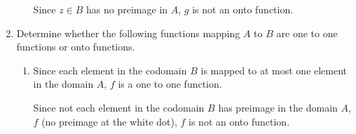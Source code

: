 \documentclass[12pt]{report}
\begin{document}
\begin{enumerate}
\begin{enumerate}
                Since $z \in B$ has no preimage in $A$, $g$ is not an onto function.
        \end{enumerate}

        \newpage

  \item Determine whether the following functions mapping $A$ to $B$ are one to one
        functions or onto functions.
        \begin{multicols}{2}
          \begin{enumerate}
            \item {}
                  \sol{}

                  Since each element in the codomain $B$ is mapped to at most one element in the
                  domain $A$, $f$ is a one to one function.

                  Since not each element in the codomain $B$ has preimage in the domain $A$, $f$
                  (no preimage at the white dot), $f$ is not an onto function.


\end{enumerate}
\end{multicols}
\end{enumerate}
\end{document}
